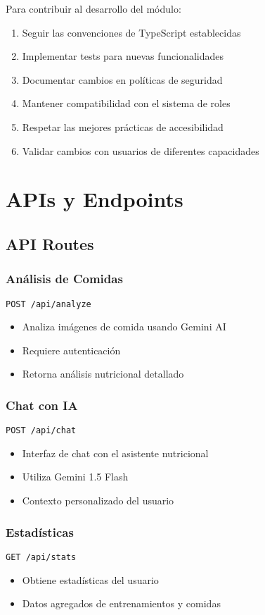 \documentclass[12pt,a4paper]{article}
\begin{document}
Para contribuir al desarrollo del módulo:
\begin{enumerate}
    \item Seguir las convenciones de TypeScript establecidas
    \item Implementar tests para nuevas funcionalidades
    \item Documentar cambios en políticas de seguridad
    \item Mantener compatibilidad con el sistema de roles
    \item Respetar las mejores prácticas de accesibilidad
    \item Validar cambios con usuarios de diferentes capacidades
\end{enumerate}


\section{APIs y Endpoints}

\subsection{API Routes}

\subsubsection{Análisis de Comidas}
\texttt{POST /api/analyze}
\begin{itemize}
    \item Analiza imágenes de comida usando Gemini AI
    \item Requiere autenticación
    \item Retorna análisis nutricional detallado
\end{itemize}

\subsubsection{Chat con IA}
\texttt{POST /api/chat}
\begin{itemize}
    \item Interfaz de chat con el asistente nutricional
    \item Utiliza Gemini 1.5 Flash
    \item Contexto personalizado del usuario
\end{itemize}

\subsubsection{Estadísticas}
\texttt{GET /api/stats}
\begin{itemize}
    \item Obtiene estadísticas del usuario
    \item Datos agregados de entrenamientos y comidas
\end{itemize}
\end{document}
